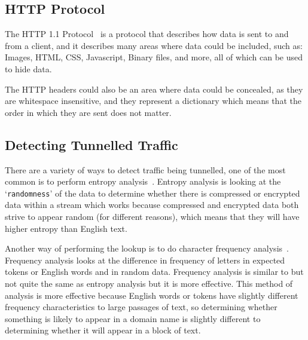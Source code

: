 \subsection{HTTP Protocol}
The HTTP 1.1 Protocol~\cite{rfc2616} is a protocol that describes how data is sent to and from a client, and it describes many areas where data could be included, such as:
Images,
HTML,
CSS,
Javascript,
Binary files,
and more, all of which can be used to hide data.\par
The HTTP headers could also be an area where data could be concealed, as they are whitespace insensitive, and they represent a dictionary which means that the order in which they are sent does not matter.

\subsection{Detecting Tunnelled Traffic}
There are a variety of ways to detect traffic being tunnelled, one of the most common is to perform entropy analysis~\cite{detectingdns}.
Entropy analysis is looking at the `\texttt{randomness}' of the data to determine whether there is compressed or encrypted data within a stream which works because compressed and encrypted data both strive to appear random (for different reasons), which means that they will have higher entropy than English text.\par
Another way of performing the lookup is to do character frequency analysis~\cite{freqanal}.
Frequency analysis looks at the difference in frequency of letters in expected tokens or English words and in random data. Frequency analysis is similar to but not quite the same as entropy analysis but it is more effective.
This method of analysis is more effective because English words or tokens have slightly different frequency characteristics to large passages of text, so determining whether something is likely to appear in a domain name is slightly different to determining whether it will appear in a block of text.

